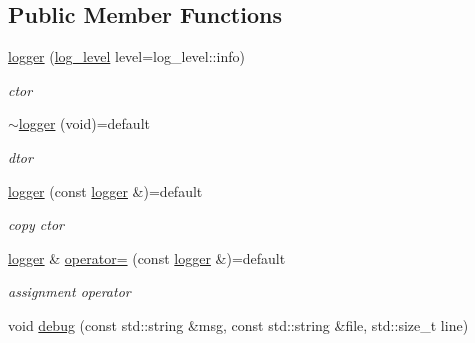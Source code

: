 \subsection*{Public Member Functions}
\begin{DoxyCompactItemize}
\item 
\mbox{\label{classcpp__redis_1_1logger_a36b15a75690a087fca7d304852785512}} 
\mbox{\hyperlink{classcpp__redis_1_1logger_a36b15a75690a087fca7d304852785512}{logger}} (\mbox{\hyperlink{classcpp__redis_1_1logger_a9493594d547e7abe71b8690be1946c7a}{log\+\_\+level}} level=log\+\_\+level\+::info)
\begin{DoxyCompactList}\small\item\em ctor \end{DoxyCompactList}\item 
\mbox{\label{classcpp__redis_1_1logger_ab5eb02b26c96a6e5cba9a7d30669f625}} 
\mbox{\hyperlink{classcpp__redis_1_1logger_ab5eb02b26c96a6e5cba9a7d30669f625}{$\sim$logger}} (void)=default
\begin{DoxyCompactList}\small\item\em dtor \end{DoxyCompactList}\item 
\mbox{\label{classcpp__redis_1_1logger_aec0854d47a13f91e09db25e745a3d722}} 
\mbox{\hyperlink{classcpp__redis_1_1logger_aec0854d47a13f91e09db25e745a3d722}{logger}} (const \mbox{\hyperlink{classcpp__redis_1_1logger}{logger}} \&)=default
\begin{DoxyCompactList}\small\item\em copy ctor \end{DoxyCompactList}\item 
\mbox{\label{classcpp__redis_1_1logger_a09d012d32f35421a16ec73143adc4415}} 
\mbox{\hyperlink{classcpp__redis_1_1logger}{logger}} \& \mbox{\hyperlink{classcpp__redis_1_1logger_a09d012d32f35421a16ec73143adc4415}{operator=}} (const \mbox{\hyperlink{classcpp__redis_1_1logger}{logger}} \&)=default
\begin{DoxyCompactList}\small\item\em assignment operator \end{DoxyCompactList}\item 
void \mbox{\hyperlink{classcpp__redis_1_1logger_a36e0908e7b05850b663a4b8b9cdbc299}{debug}} (const std\+::string \&msg, const std\+::string \&file, std\+::size\+\_\+t line)

\end{DoxyCompactItemize}

